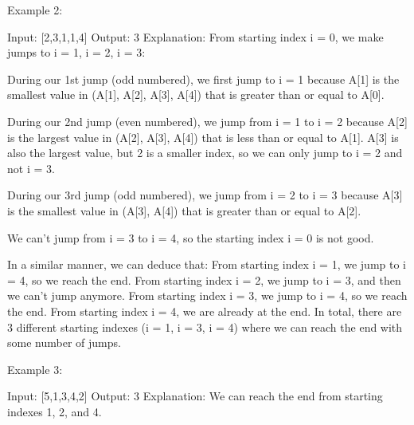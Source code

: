Example 2:
\begin{Code}
Input: [2,3,1,1,4]
Output: 3
Explanation:
From starting index i = 0, we make jumps to i = 1, i = 2, i = 3:

During our 1st jump (odd numbered), we first jump to i = 1 because A[1] is the smallest value in (A[1], A[2], A[3], A[4]) that is greater than or equal to A[0].

During our 2nd jump (even numbered), we jump from i = 1 to i = 2 because A[2] is the largest value in (A[2], A[3], A[4]) that is less than or equal to A[1].  A[3] is also the largest value, but 2 is a smaller index, so we can only jump to i = 2 and not i = 3.

During our 3rd jump (odd numbered), we jump from i = 2 to i = 3 because A[3] is the smallest value in (A[3], A[4]) that is greater than or equal to A[2].

We can't jump from i = 3 to i = 4, so the starting index i = 0 is not good.

In a similar manner, we can deduce that:
From starting index i = 1, we jump to i = 4, so we reach the end.
From starting index i = 2, we jump to i = 3, and then we can't jump anymore.
From starting index i = 3, we jump to i = 4, so we reach the end.
From starting index i = 4, we are already at the end.
In total, there are 3 different starting indexes (i = 1, i = 3, i = 4) where we can reach the end with some number of jumps.
\end{Code}

Example 3:
\begin{Code}
Input: [5,1,3,4,2]
Output: 3
Explanation:
We can reach the end from starting indexes 1, 2, and 4.
\end{Code}


